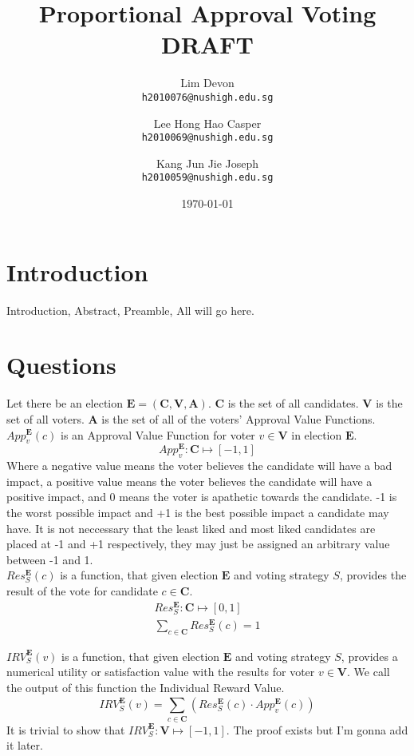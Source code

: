 \documentclass{article}
\title{Proportional Approval Voting\\DRAFT}
\author{
  Lim Devon\\
  \texttt{h2010076@nushigh.edu.sg}
  \and
  Lee Hong Hao Casper\\
  \texttt{h2010069@nushigh.edu.sg}
  \and
  Kang Jun Jie Joseph\\
  \texttt{h2010059@nushigh.edu.sg}
}
\date{\today}
\begin{document}
\maketitle

\section{Introduction}
Introduction, Abstract, Preamble, All will go here.

\section{Questions}

Let there be an election $\boldsymbol{E} = (\boldsymbol{C}, \boldsymbol{V}, \boldsymbol{A})$.
$\boldsymbol{C}$ is the set of all candidates.
$\boldsymbol{V}$ is the set of all voters.
$\boldsymbol{A}$ is the set of all of the voters' Approval Value Functions.\\

$App^{\boldsymbol{E}}_{v}(c)$ is an Approval Value Function for voter $v \in \boldsymbol{V}$ in election $\boldsymbol{E}$.
\begin{equation}
App^{\boldsymbol{E}}_{v} : \boldsymbol{C} \mapsto [-1,1]
\end{equation}
Where a negative value means the voter believes the candidate will have a bad impact, a positive value means the voter believes the candidate will have a positive impact, and 0 means the voter is apathetic towards the candidate. -1 is the worst possible impact and +1 is the best possible impact a candidate may have. It is not neccessary that the least liked and most liked candidates are placed at -1 and +1 respectively, they may just be assigned an arbitrary value between -1 and 1.\\

$Res^{\boldsymbol{E}}_{S}(c)$ is a function, that given election $\boldsymbol{E}$ and voting strategy $S$, provides the result of the vote for candidate $c \in \boldsymbol{C}$.
\begin{gather}
Res^{\boldsymbol{E}}_{S} : \boldsymbol{C} \mapsto [0,1]\\
\sum^{}_{c \in \boldsymbol{C}}{Res^{\boldsymbol{E}}_{S}(c)} = 1
\end{gather}

${IRV}^{\boldsymbol{E}}_{S}(v)$ is a function, that given election $\boldsymbol{E}$ and voting strategy $S$, provides a numerical utility or satisfaction value with the results for voter $v \in \boldsymbol{V}$. We call the output of this function the Individual Reward Value.
\begin{equation}
{IRV}^{\boldsymbol{E}}_{S}(v) = \sum^{}_{c \in \boldsymbol{C}}{(Res^{\boldsymbol{E}}_{S}(c) \cdot App^{\boldsymbol{E}}_{v}(c))}
\end{equation}
It is trivial to show that ${IRV}^{\boldsymbol{E}}_{S} : \boldsymbol{V} \mapsto [-1,1]$. The proof exists but I'm gonna add it later.
\end{document}

